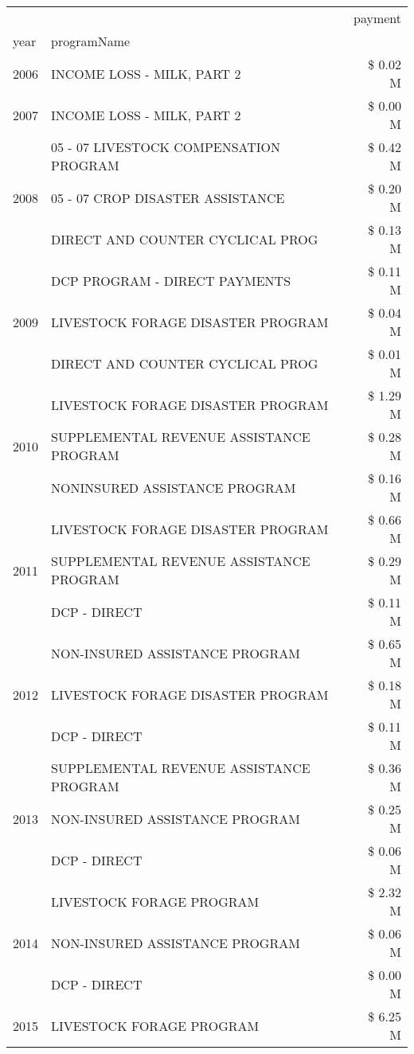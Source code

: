 \begin{tabular}{llr}
\toprule
 &  & payment \\
year & programName &  \\
\midrule
2006 & INCOME LOSS - MILK, PART 2 & \$ 0.02 M \\
\cline{1-3}
2007 & INCOME LOSS - MILK, PART 2 & \$ 0.00 M \\
\cline{1-3}
\multirow[t]{3}{*}{2008} & 05 - 07 LIVESTOCK COMPENSATION PROGRAM & \$ 0.42 M \\
 & 05 - 07 CROP DISASTER ASSISTANCE & \$ 0.20 M \\
 & DIRECT AND COUNTER CYCLICAL PROG & \$ 0.13 M \\
\cline{1-3}
\multirow[t]{3}{*}{2009} & DCP PROGRAM - DIRECT PAYMENTS & \$ 0.11 M \\
 & LIVESTOCK FORAGE DISASTER  PROGRAM & \$ 0.04 M \\
 & DIRECT AND COUNTER CYCLICAL PROG & \$ 0.01 M \\
\cline{1-3}
\multirow[t]{3}{*}{2010} & LIVESTOCK FORAGE DISASTER  PROGRAM & \$ 1.29 M \\
 & SUPPLEMENTAL REVENUE ASSISTANCE PROGRAM & \$ 0.28 M \\
 & NONINSURED ASSISTANCE PROGRAM & \$ 0.16 M \\
\cline{1-3}
\multirow[t]{3}{*}{2011} & LIVESTOCK FORAGE DISASTER PROGRAM & \$ 0.66 M \\
 & SUPPLEMENTAL REVENUE ASSISTANCE PROGRAM & \$ 0.29 M \\
 & DCP - DIRECT & \$ 0.11 M \\
\cline{1-3}
\multirow[t]{3}{*}{2012} & NON-INSURED ASSISTANCE PROGRAM & \$ 0.65 M \\
 & LIVESTOCK FORAGE DISASTER PROGRAM & \$ 0.18 M \\
 & DCP - DIRECT & \$ 0.11 M \\
\cline{1-3}
\multirow[t]{3}{*}{2013} & SUPPLEMENTAL REVENUE ASSISTANCE PROGRAM & \$ 0.36 M \\
 & NON-INSURED ASSISTANCE PROGRAM & \$ 0.25 M \\
 & DCP - DIRECT & \$ 0.06 M \\
\cline{1-3}
\multirow[t]{3}{*}{2014} & LIVESTOCK FORAGE PROGRAM & \$ 2.32 M \\
 & NON-INSURED ASSISTANCE PROGRAM & \$ 0.06 M \\
 & DCP - DIRECT & \$ 0.00 M \\
\cline{1-3}
\multirow[t]{3}{*}{2015} & LIVESTOCK FORAGE PROGRAM & \$ 6.25 M \\

\end{tabular}
